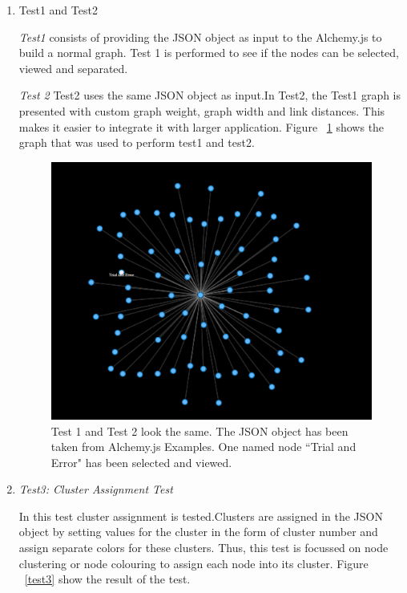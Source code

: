 \begin{enumerate}
\item Test1 and Test2
\par \textit{Test1} consists of providing the JSON object as input to the Alchemy.js to build a normal graph. Test 1 is performed to see if the nodes can be selected, viewed and separated.
\par \textit{Test 2} Test2 uses the same JSON object as input.In Test2, the Test1 graph is presented with custom graph weight, graph width and link distances. This makes it easier to integrate it with larger application. Figure ~\ref{test1} shows the graph that was used to perform test1 and test2.

\begin{figure}[H]
\centering
\includegraphics[scale=0.3]{t1.png}
\caption{\label{test1}Test 1 and Test 2 look the same. The JSON object has been taken from Alchemy.js Examples. One named node ``Trial and Error" has been selected and viewed.}
\end{figure}

\item \textit{Test3: Cluster Assignment Test}
\par In this test cluster assignment is tested.Clusters are assigned in the JSON object by setting values for the cluster in the form of cluster number and assign separate colors for these clusters.	Thus, this test is focussed on node clustering or node colouring to assign each node into its cluster. Figure ~\ref{test3} show the result of the test. 


\end{enumerate}

